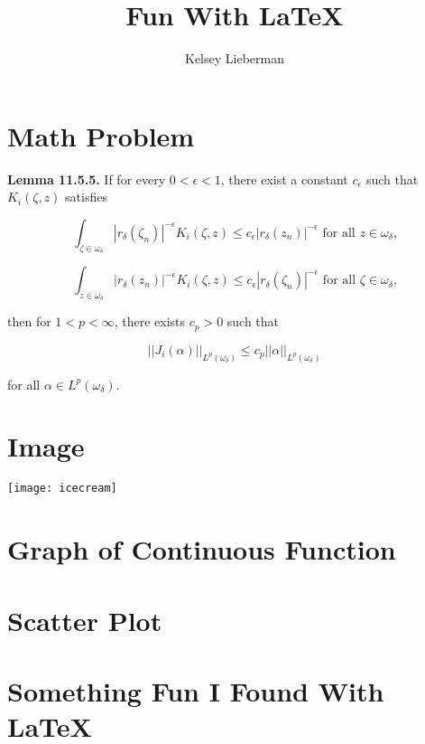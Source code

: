 \documentclass{article}
\title{Fun With \LaTeX}
\author{Kelsey Lieberman}
\begin{document}
\maketitle

\section{Math Problem}

\textbf{Lemma 11.5.5.}
If for every $0<\epsilon<1$, there exist a constant $c_\epsilon$ such that $K_i(\zeta,z)$ satisfies

\begin{equation}
 \int_{\zeta\in\omega_\delta} |r_\delta(\zeta_n)|^{-\epsilon}K_i(\zeta,z) \leq c_\epsilon|r_\delta(z_n)|^{-\epsilon} \textrm{ for all } z \in \omega_\delta \textrm{,}
 \end{equation}

\begin{equation}
\int_{z\in\omega_\delta}|r_\delta(z_n)|^{-\epsilon}K_i(\zeta,z) \leq c_\epsilon|r_\delta(\zeta_n)|^{-\epsilon} \textrm{ for all }  \zeta \in \omega_\delta  \textrm{,}
\end{equation}

then for $1 < p < \infty$, there exists $c_p > 0$ such that

$$||J_i(\alpha)||_{L^p(\omega_\delta)} \leq c_p||\alpha||_{L^p(\omega_\delta)}$$

for all $\alpha \in L^p(\omega_\delta)$.



\section{Image}
\texttt{[image: icecream]}
\centering

\flushleft
\section{Graph of Continuous Function}


		
	
\section{Scatter Plot}

\section{Something Fun I Found With \LaTeX}
\end{document}
